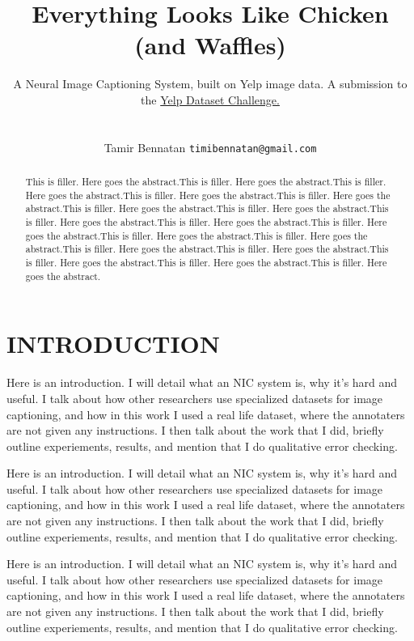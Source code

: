 \documentclass[letterpaper, 10 pt, conference]{ieeeconf}
\title{\LARGE \bf
Everything Looks Like Chicken (and Waffles)
}
\author{ \large A Neural Image Captioning System, built on Yelp image data. A submission to the  \href{https://www.yelp.com/dataset/challenge}{Yelp Dataset Challenge.} \\ \\
	\parbox{2 in}{\centering Tamir Bennatan
         {\tt\small timibennatan@gmail.com}
}}
\begin{document}
\nocite{vinyals}
\nocite{tanti1}
\nocite{tanti2}
\nocite{cho}
\nocite{kumar}
\nocite{xu}
\nocite{8k}
\nocite{30k}
\nocite{coco}
\nocite{wu}

\maketitle
\thispagestyle{empty}
\pagestyle{empty}

\begin{abstract}
This is filler. Here goes the abstract.This is filler. Here goes the abstract.This is filler. Here goes the abstract.This is filler. Here goes the abstract.This is filler. Here goes the abstract.This is filler. Here goes the abstract.This is filler. Here goes the abstract.This is filler. Here goes the abstract.This is filler. Here goes the abstract.This is filler. Here goes the abstract.This is filler. Here goes the abstract.This is filler. Here goes the abstract.This is filler. Here goes the abstract.This is filler. Here goes the abstract.This is filler. Here goes the abstract.This is filler. Here goes the abstract.This is filler. Here goes the abstract.
\end{abstract}




\section{INTRODUCTION}

Here is an introduction. I will detail what an NIC system is, why it's hard and useful. I talk about how other researchers use specialized datasets for image captioning, and how in this work I used a real life dataset, where the annotaters are not given any instructions. I then talk about the work that I did, briefly outline experiements, results, and mention that I do qualitative error checking. 

Here is an introduction. I will detail what an NIC system is, why it's hard and useful. I talk about how other researchers use specialized datasets for image captioning, and how in this work I used a real life dataset, where the annotaters are not given any instructions. I then talk about the work that I did, briefly outline experiements, results, and mention that I do qualitative error checking. 

Here is an introduction. I will detail what an NIC system is, why it's hard and useful. I talk about how other researchers use specialized datasets for image captioning, and how in this work I used a real life dataset, where the annotaters are not given any instructions. I then talk about the work that I did, briefly outline experiements, results, and mention that I do qualitative error checking. 
\end{document}
